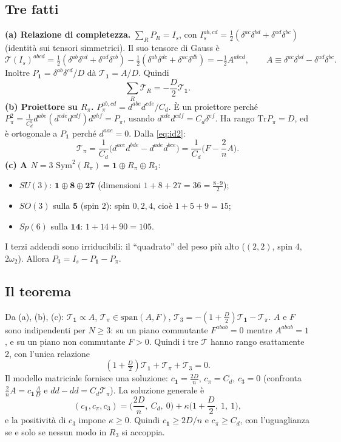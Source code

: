 \documentclass[11pt,a4paper]{article}
\numberwithin{equation}{section}
\theoremstyle{remark}
\newcommand{\Tr}{\mathrm{Tr}}
\begin{document}
\subsection{Tre fatti}

\textbf{(a) Relazione di completezza.} $\sum_RP_R=I_s$, con $I_s^{ab,cd}=\frac12(\delta^{ac}\delta^{bd}+\delta^{ad}\delta^{bc})$ (identità sui tensori simmetrici). Il suo tensore di Gauss è
\[
\mathcal T(I_s)^{abcd}=\tfrac12(\delta^{ab}\delta^{cd}+\delta^{ad}\delta^{cb})-\tfrac12(\delta^{ab}\delta^{dc}+\delta^{ac}\delta^{db})=-\tfrac12A^{abcd},\qquad A\equiv\delta^{ac}\delta^{bd}-\delta^{ad}\delta^{bc}.
\]
Inoltre $P_{\mathbf1}=\delta^{ab}\delta^{cd}/D$ dà $\mathcal T_{\mathbf1}=A/D$. Quindi
\begin{equation}
\sum_R\mathcal T_R=-\frac D2\mathcal T_{\mathbf 1}.
\end{equation}
\textbf{(b) Proiettore su $R_\pi$.} $P_\pi^{ab,cd}=d^{abe}d^{cde}/C_d$. È un proiettore perché $P_\pi^2=\frac{1}{C_d^2}d^{abe}(d^{cde}d^{cdf})d^{ghf}=P_\pi$, usando $d^{cde}d^{cdf}=C_d\delta^{ef}$. Ha rango $\Tr P_\pi=D$, ed è ortogonale a $P_{\mathbf1}$ perché $d^{aae}=0$. Dalla \eqref{eq:id2}:
\[
\mathcal T_\pi=\frac{1}{C_d}\big(d^{ace}d^{bde}-d^{ade}d^{bce}\big)=\frac{1}{C_d}\Big(F-\frac2nA\Big).
\]
\textbf{(c) A $N=3$} $\mathrm{Sym}^2(R_\pi)=\mathbf1\oplus R_\pi\oplus R_3$:
\begin{itemize}[nosep]
\item $SU(3)$: $\mathbf1\oplus\mathbf8\oplus\mathbf{27}$ (dimensioni $1+8+27=36=\frac{8\cdot9}2$);
\item $SO(3)$ sulla $\mathbf5$ (spin 2): spin $0,2,4$, cioè $1+5+9=15$;
\item $Sp(6)$ sulla $\mathbf{14}$: $1+14+90=105$.
\end{itemize}
I terzi addendi sono irriducibili: il ``quadrato'' del peso più alto ($(2,2)$, spin 4, $2\omega_2$). Allora $P_3=I_s-P_{\mathbf1}-P_\pi$.

\subsection{Il teorema}

Da (a), (b), (c): $\mathcal T_{\mathbf1}\propto A$, $\mathcal T_\pi\in\mathrm{span}(A,F)$, $\mathcal T_3=-(1+\frac D2)\mathcal T_{\mathbf1}-\mathcal T_\pi$. $A$ e $F$ sono indipendenti per $N\ge3$: su un piano commutante $F^{abab}=0$ mentre $A^{abab}=1$, e su un piano non commutante $F>0$. Quindi i tre $\mathcal T$ hanno rango esattamente 2, con l'unica relazione
\[
(1+\tfrac D2)\mathcal T_{\mathbf1}+\mathcal T_\pi+\mathcal T_3=0 .
\]
Il modello matriciale fornisce una soluzione: $c_{\mathbf1}=\frac{2D}{n}$, $c_\pi=C_d$, $c_3=0$ (confronta $\frac2nA=c_{\mathbf1}\frac AD$ e $dd-dd=C_d\mathcal T_\pi$). La soluzione generale è
\[
(c_{\mathbf1},c_\pi,c_3)=\Big(\frac{2D}n,\ C_d,\ 0\Big)+\kappa\Big(1+\frac D2,\ 1,\ 1\Big),
\]
e la positività di $c_3$ impone $\kappa\ge0$. Quindi $c_{\mathbf1}\ge2D/n$ e $c_\pi\ge C_d$, con l'uguaglianza se e solo se nessun modo in $R_3$ si accoppia.
\end{document}

